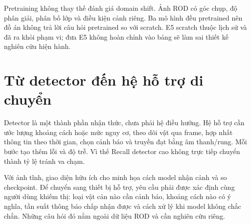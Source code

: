 Pretraining không thay thế đánh giá domain shift. Ảnh ROD có góc chụp, độ phân giải, phân bố lớp và điều kiện cảnh riêng. Ba mô hình đều pretrained nên đồ án không trả lời câu hỏi pretrained so với scratch. E5 scratch thuộc lịch sử và đã ra khỏi phạm vi; đưa E5 không hoàn chỉnh vào bảng sẽ làm sai thiết kế nghiên cứu hiện hành.

\section{Từ detector đến hệ hỗ trợ di chuyển}
Detector là một thành phần nhận thức, chưa phải hệ điều hướng. Hệ hỗ trợ cần ước lượng khoảng cách hoặc mức nguy cơ, theo dõi vật qua frame, hợp nhất thông tin theo thời gian, chọn cảnh báo và truyền đạt bằng âm thanh/rung. Mỗi bước tạo thêm lỗi và độ trễ. Vì thế Recall detector cao không trực tiếp chuyển thành tỷ lệ tránh va chạm.

Với ảnh tĩnh, giao diện hữu ích cho minh họa cách model nhận cảnh và so checkpoint. Để chuyển sang thiết bị hỗ trợ, yêu cầu phải được xác định cùng người dùng khiếm thị: loại vật cản nào cần cảnh báo, khoảng cách nào có ý nghĩa, tần suất thông báo chấp nhận được và cách xử lý khi model không chắc chắn. Những câu hỏi đó nằm ngoài dữ liệu ROD và cần nghiên cứu riêng.
